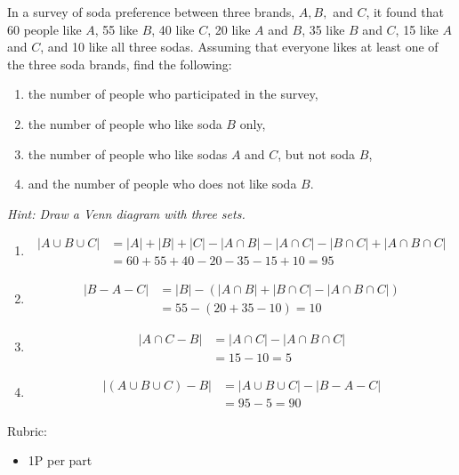 \documentclass{article}
\theoremstyle{definition}
\begin{document}
\begin{question}{4}
   In a survey of soda preference between three brands, $A, B,$ and $C$, it found that 60 people like $A$, 55 like $B$, 40 like $C$, 20 like $A$ and $B$, 35 like $B$ and $C$, 15 like $A$ and $C$, and 10 like all three sodas. Assuming that everyone likes at least one of the three soda brands, find the following:
   \begin{enumerate}
   \item the number of people who participated in the survey,
   \item the number of people who like soda $B$ only,
   \item the number of people who like sodas $A$ and $C$, but not soda $B$, 
   \item and the number of people who does not like soda $B$.
   \end{enumerate}
   
   \textit{ Hint: Draw a Venn diagram with three sets.}
\end{question}
\begin{solution}
   \begin{enumerate}
   \item 
   \begin{align*}
   |A \cup B \cup C| & = |A| + |B| + |C| - |A\cap B| - |A\cap C| - |B\cap C| + |A\cap B \cap C| \\ 
   &= 60 + 55 + 40 - 20 - 35 - 15 + 10 = 95
   \end{align*}
   \item 
   \begin{align*}
   |B-A-C| &= |B| - (|A\cap B| + |B\cap C| - |A\cap B\cap C|)\\
   & = 55- (20 + 35 - 10) = 10
   \end{align*}
   \item 
   \begin{align*}
   |A\cap C - B| & = |A\cap C| - |A\cap B \cap C| \\
   & = 15 - 10 = 5
   \end{align*} 
   \item 
   \begin{align*}
   |(A\cup B\cup C) - B| &= |A\cup B\cup C| - |B-A-C|\\
   & = 95- 5 = 90
   \end{align*}
   \end{enumerate}

{\color{red} Rubric:
\begin{itemize}
\item 1P per part
\end{itemize}}
\end{solution}
\end{document}
